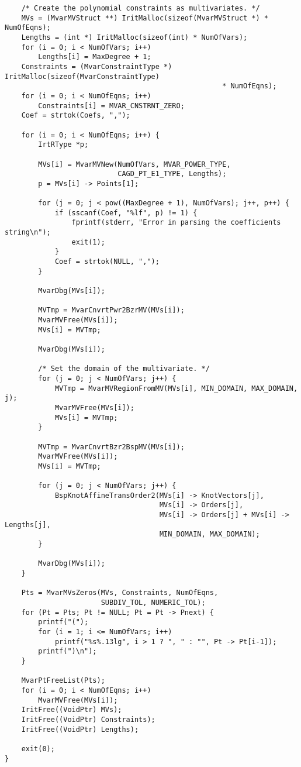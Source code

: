 \begin{verbatim}
    /* Create the polynomial constraints as multivariates. */
    MVs = (MvarMVStruct **) IritMalloc(sizeof(MvarMVStruct *) * NumOfEqns);
    Lengths = (int *) IritMalloc(sizeof(int) * NumOfVars);
    for (i = 0; i < NumOfVars; i++)
        Lengths[i] = MaxDegree + 1;
    Constraints = (MvarConstraintType *) IritMalloc(sizeof(MvarConstraintType)
                                                    * NumOfEqns);
    for (i = 0; i < NumOfEqns; i++)
        Constraints[i] = MVAR_CNSTRNT_ZERO;
    Coef = strtok(Coefs, ",");

    for (i = 0; i < NumOfEqns; i++) {
        IrtRType *p;

        MVs[i] = MvarMVNew(NumOfVars, MVAR_POWER_TYPE,
                           CAGD_PT_E1_TYPE, Lengths);
        p = MVs[i] -> Points[1];

        for (j = 0; j < pow((MaxDegree + 1), NumOfVars); j++, p++) {
            if (sscanf(Coef, "%lf", p) != 1) {
                fprintf(stderr, "Error in parsing the coefficients string\n");
                exit(1);
            }
            Coef = strtok(NULL, ",");
        }

        MvarDbg(MVs[i]);

        MVTmp = MvarCnvrtPwr2BzrMV(MVs[i]);
        MvarMVFree(MVs[i]);
        MVs[i] = MVTmp;

        MvarDbg(MVs[i]);

        /* Set the domain of the multivariate. */
        for (j = 0; j < NumOfVars; j++) {
            MVTmp = MvarMVRegionFromMV(MVs[i], MIN_DOMAIN, MAX_DOMAIN, j);
            MvarMVFree(MVs[i]);
            MVs[i] = MVTmp;
        }

        MVTmp = MvarCnvrtBzr2BspMV(MVs[i]);
        MvarMVFree(MVs[i]);
        MVs[i] = MVTmp;

        for (j = 0; j < NumOfVars; j++) {
            BspKnotAffineTransOrder2(MVs[i] -> KnotVectors[j],
                                     MVs[i] -> Orders[j],
                                     MVs[i] -> Orders[j] + MVs[i] -> Lengths[j],
                                     MIN_DOMAIN, MAX_DOMAIN);
        }

        MvarDbg(MVs[i]);
    }

    Pts = MvarMVsZeros(MVs, Constraints, NumOfEqns,
                       SUBDIV_TOL, NUMERIC_TOL);
    for (Pt = Pts; Pt != NULL; Pt = Pt -> Pnext) {
        printf("(");
        for (i = 1; i <= NumOfVars; i++)
            printf("%s%.13lg", i > 1 ? ", " : "", Pt -> Pt[i-1]);
        printf(")\n");
    }  

    MvarPtFreeList(Pts);
    for (i = 0; i < NumOfEqns; i++)
        MvarMVFree(MVs[i]);
    IritFree((VoidPtr) MVs);
    IritFree((VoidPtr) Constraints);
    IritFree((VoidPtr) Lengths);

    exit(0);
}
\end{verbatim}
